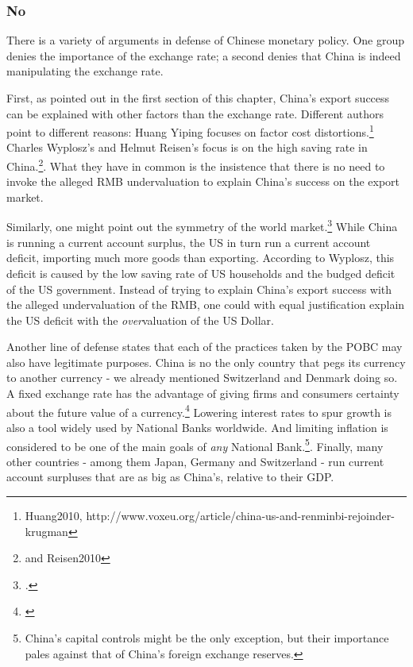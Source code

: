 \subsubsection{No}

There is a variety of arguments in defense of Chinese monetary policy. One group denies the importance of the exchange rate; a second denies that China is indeed manipulating the exchange rate.

First, as pointed out in the first section of this chapter, China's export success can be explained with other factors than the exchange rate.  Different authors point to different reasons: Huang Yiping focuses on factor cost distortions.\footnote{Huang2010, http://www.voxeu.org/article/china-us-and-renminbi-rejoinder-krugman} Charles Wyplosz's and Helmut Reisen's focus is on the high saving rate in China.\footnote{\cite[pp. 40]{Wyplosz2010} and \cite{p. 65}{Reisen2010}}. What they have in common is the insistence that there is no need to invoke the alleged RMB undervaluation to explain China's success on the export market.

Similarly, one might point out the symmetry of the world market.\footnote{\cite[pp. 39-40]{Wyplosz2010}.} While China is running a current account surplus, the US in turn run a current account deficit, importing much more goods than exporting. According to Wyplosz, this deficit is caused by the low saving rate of US households and the budged deficit of the US government. Instead of trying to explain China's export success with the alleged undervaluation of the RMB, one could with equal justification explain the US deficit with the \emph{over}valuation of the US Dollar. 

Another line of defense states that each of the practices taken by the POBC may also have legitimate purposes. China is no the only country that pegs its currency to another currency - we already mentioned Switzerland and Denmark doing so. A fixed exchange rate has the advantage of giving firms and consumers certainty about the future value of a currency.\footnote{\cite[p. 515]{Krugman2008}} Lowering interest rates to spur growth is also a tool widely used by National Banks worldwide. And limiting inflation is considered to be one of the main goals of \emph{any} National Bank.\footnote{China's capital controls might be the only exception, but their importance pales against that of China's foreign exchange reserves.}. Finally, many other countries - among them Japan, Germany and Switzerland - run current account surpluses that are as big as China's, relative to their GDP.

